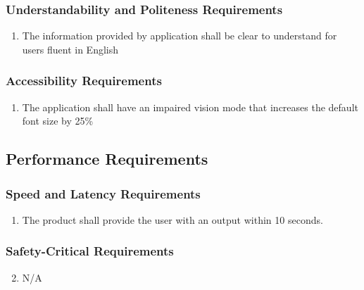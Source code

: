 \documentclass[]{article}
\begin{document}
\subsubsection{Understandability and Politeness Requirements}
\label{ssub:understandability_and_politeness_requirements}
\begin{enumerate}[{UH}6. ]
	\item The information provided by application {\color{red}shall} be clear to understand for users fluent in English
\end{enumerate}

\subsubsection{Accessibility Requirements}
\label{ssub:accessibility_requirements}
\begin{enumerate}[{UH}7. ]
	\item {\color{red}The application shall have an impaired vision mode that increases the default font size by 25\%}
\end{enumerate}


\subsection{Performance Requirements}
\label{sub:performance_requirements}

\subsubsection{Speed and Latency Requirements}
\label{ssub:speed_and_latency_requirements}
\begin{enumerate}[{PR}1.]
	\item The product shall provide the user with {\color{red}an output} within 10 seconds.
\end{enumerate}

\subsubsection{Safety-Critical Requirements}
\label{ssub:safety_critical_requirements}
\begin{enumerate}[{PR}1.]
	\setcounter{enumi}{1}
	\item N/A
\end{enumerate}
\end{document}
